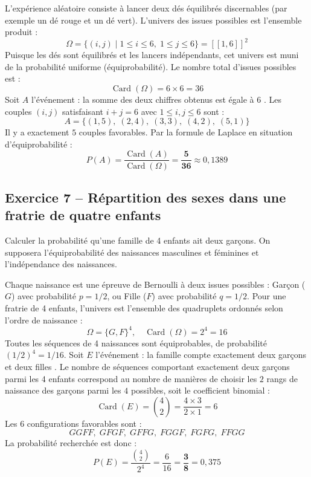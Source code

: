 \documentclass[11pt,a4paper]{article}
\begin{document}
\begin{correctionbox}
L'expérience aléatoire consiste à lancer deux dés équilibrés discernables (par exemple un dé rouge et un dé vert).
L'univers des issues possibles est l'ensemble produit :
\[
\Omega = \{ (i, j) \mid 1 \le i \le 6, \; 1 \le j \le 6 \} = [\![1, 6]\!]^2
\]
Puisque les dés sont équilibrés et les lancers indépendants, cet univers est muni de la probabilité uniforme (équiprobabilité).
Le nombre total d'issues possibles est :
\[
\operatorname{Card}(\Omega) = 6 \times 6 = 36
\]
Soit $A$ l'événement : \og la somme des deux chiffres obtenus est égale à 6 \fg{}.
Les couples $(i, j)$ satisfaisant $i + j = 6$ avec $1 \le i, j \le 6$ sont :
\[
A = \{ (1, 5), \; (2, 4), \; (3, 3), \; (4, 2), \; (5, 1) \}
\]
Il y a exactement $5$ couples favorables. Par la formule de Laplace en situation d'équiprobabilité :
\[
P(A) = \frac{\operatorname{Card}(A)}{\operatorname{Card}(\Omega)} = \mathbf{\frac{5}{36}} \approx 0{,}1389
\]
\end{correctionbox}

\vspace{0.3cm}

\subsection*{Exercice 7 -- Répartition des sexes dans une fratrie de quatre enfants}

Calculer la probabilité qu'une famille de 4 enfants ait deux garçons. On supposera l'équiprobabilité des naissances masculines et féminines et l'indépendance des naissances.

\begin{correctionbox}
Chaque naissance est une épreuve de Bernoulli à deux issues possibles : Garçon ($G$) avec probabilité $p = 1/2$, ou Fille ($F$) avec probabilité $q = 1/2$.
Pour une fratrie de 4 enfants, l'univers est l'ensemble des quadruplets ordonnés selon l'ordre de naissance :
\[
\Omega = \{G, F\}^4, \quad \operatorname{Card}(\Omega) = 2^4 = 16
\]
Toutes les séquences de 4 naissances sont équiprobables, de probabilité $(1/2)^4 = 1/16$.
Soit $E$ l'événement : \og la famille compte exactement deux garçons et deux filles \fg{}.
Le nombre de séquences comportant exactement deux garçons parmi les 4 enfants correspond au nombre de manières de choisir les $2$ rangs de naissance des garçons parmi les $4$ possibles, soit le coefficient binomial :
\[
\operatorname{Card}(E) = \binom{4}{2} = \frac{4 \times 3}{2 \times 1} = 6
\]
Les $6$ configurations favorables sont :
\[
GGFF, \; GFGF, \; GFFG, \; FGGF, \; FGFG, \; FFGG
\]
La probabilité recherchée est donc :
\[
P(E) = \frac{\binom{4}{2}}{2^4} = \frac{6}{16} = \mathbf{\frac{3}{8}} = 0{,}375
\]
\end{correctionbox}
\end{document}

